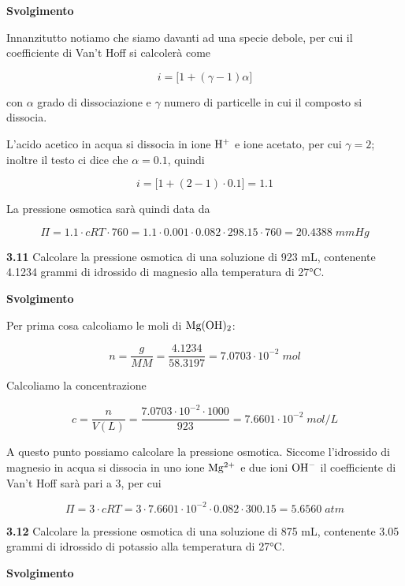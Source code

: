 \vspace{0.2cm}\large\textbf{Svolgimento}\normalsize

\vspace{0.2cm}Innanzitutto notiamo che siamo davanti ad una specie debole, per cui il coefficiente di Van't Hoff si calcolerà come

$$i=\big[1 + (\gamma -1)\alpha\big]$$

con $\alpha$ grado di dissociazione e $\gamma$ numero di particelle in cui il composto si dissocia.

L'acido acetico in acqua si dissocia in ione $\rm H^+$ e ione acetato, per cui $\gamma=2$; inoltre il testo ci dice che $\alpha=0.1$, quindi

$$i=\big[1 + (2-1) \cdot 0.1\big]=1.1$$

La pressione osmotica sarà quindi data da

$$\Pi=1.1 \cdot cRT \cdot 760
=1.1 \cdot 0.001 \cdot 0.082 \cdot 298.15 \cdot 760=20.4388\;mmHg$$

\vspace{0.2cm}\textbf{3.11} Calcolare la pressione osmotica di una soluzione di 923 mL, contenente 4.1234 grammi di idrossido di magnesio alla temperatura di 27°C. 

\vspace{0.2cm}\large\textbf{Svolgimento}\normalsize

\vspace{0.2cm}Per prima cosa calcoliamo le moli di $\rm Mg(OH)_2$:

$$n=\frac{g}{MM}=\frac{4.1234}{58.3197}=7.0703 \cdot 10^{-2}\;mol$$

Calcoliamo la concentrazione

$$c=\frac{n}{V(L)}=\frac{7.0703 \cdot 10^{-2} \cdot 1000}{923}=7.6601 \cdot 10^{-2}\;mol/L$$

A questo punto possiamo calcolare la pressione osmotica. Siccome l'idrossido di magnesio in acqua si dissocia in uno ione $\rm Mg^{2+}$ e due ioni $\rm OH^-$ il coefficiente di Van't Hoff sarà pari a 3, per cui

$$\Pi=3 \cdot cRT
=3 \cdot 7.6601 \cdot 10^{-2} \cdot 0.082 \cdot 300.15
=5.6560\;atm$$

\vspace{0.2cm}\textbf{3.12} Calcolare la pressione osmotica di una soluzione di 875 mL, contenente 3.05 grammi di idrossido
di potassio alla temperatura di 27°C.

\vspace{0.2cm}\large\textbf{Svolgimento}\normalsize

